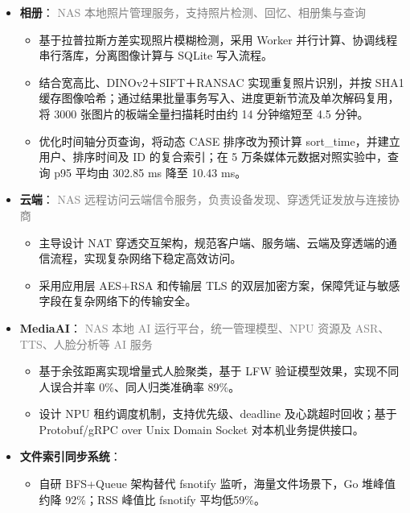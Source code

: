 \documentclass{styles/resume}
\begin{document}
\begin{minipage}{\textwidth}
\begin{itemize}
    \item \textbf{相册}：
    {\small
    \noindent\textcolor{gray}{NAS 本地照片管理服务，支持照片检测、回忆、相册集与查询}
    }
    \vspace{0.2ex}
    \begin{itemize}
        \item 基于拉普拉斯方差实现照片模糊检测，采用 Worker 并行计算、协调线程串行落库，分离图像计算与 SQLite 写入流程。
        \item 结合宽高比、DINOv2＋SIFT＋RANSAC 实现重复照片识别，并按 SHA1 缓存图像哈希；通过结果批量事务写入、进度更新节流及单次解码复用，将 3000 张图片的板端全量扫描耗时由约 14 分钟缩短至 4.5 分钟。
        \item 优化时间轴分页查询，将动态 CASE 排序改为预计算 sort\_time，并建立用户、排序时间及 ID 的复合索引；在 5 万条媒体元数据对照实验中，查询 p95 平均由 302.85 ms 降至 10.43 ms。
    \end{itemize}
    \vspace{1ex}

     \item \textbf{云端}：
    {\small
    \noindent\textcolor{gray}{NAS 远程访问云端信令服务，负责设备发现、穿透凭证发放与连接协商}
    }
    \vspace{0.2ex}
    \begin{itemize}
        \item 主导设计 NAT 穿透交互架构，规范客户端、服务端、云端及穿透端的通信流程，实现复杂网络下稳定高效访问。
        \item 采用应用层 AES+RSA 和传输层 TLS 的双层加密方案，保障凭证与敏感字段在复杂网络下的传输安全。
    \end{itemize}
    \vspace{1ex}

    \item \textbf{MediaAI}：
    {\small
    \noindent\textcolor{gray}{NAS 本地 AI 运行平台，统一管理模型、NPU 资源及 ASR、TTS、人脸分析等 AI 服务}
    }
    \vspace{0.2ex}
    \begin{itemize}
        \item 基于余弦距离实现增量式人脸聚类，基于 LFW 验证模型效果，实现不同人误合并率 0\%、同人归类准确率 89\%。
        \item 设计 NPU 租约调度机制，支持优先级、deadline 及心跳超时回收；基于 Protobuf/gRPC over Unix Domain Socket 对本机业务提供接口。
    \end{itemize}
    \vspace{1ex}

    \item \textbf{文件索引同步系统}：
    \begin{itemize}
        \item 自研 BFS+Queue 架构替代 fsnotify 监听，海量文件场景下，Go 堆峰值约降 92\%；RSS 峰值比 fsnotify 平均低59\%。
    \end{itemize}

\end{itemize}

\end{minipage}\par
\vspace*{\fill}
\end{document}
